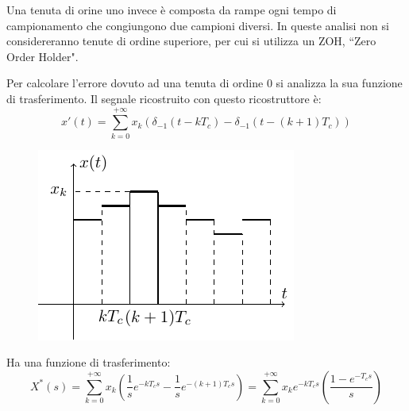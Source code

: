 \documentclass{article}
\numberwithin{equation}{subsection}
\begin{document}
Una tenuta di orine uno invece è composta da rampe ogni tempo di campionamento che congiungono due campioni diversi. In queste analisi non si considereranno tenute di 
ordine superiore, per cui si utilizza un ZOH, ``Zero Order Holder".

Per calcolare l'errore dovuto ad una tenuta di ordine $0$ si analizza la sua funzione di trasferimento. Il segnale ricostruito con questo ricostruttore è:
\begin{equation}
    x'(t)=\sum_{k=0}^{+\infty}x_k(\delta_{-1}(t-kT_c)-\delta_{-1}(t-(k+1)T_c))
\end{equation}
\begin{figure}[H]%
    \centering
    \includegraphics{tenuta-0-1.pdf}%
\end{figure}

Ha una funzione di trasferimento: 
\begin{equation}
    X^*(s)=\sum_{k=0}^{+\infty}x_k\left(\displaystyle\frac{1}{s}e^{-kT_cs}-\frac{1}{s}e^{-(k+1)T_cs}\right)=\sum_{k=0}^{+\infty}x_ke^{-kT_cs}\left(\frac{1-e^{-T_cs}}{s}\right)
\end{equation}
\end{document}
